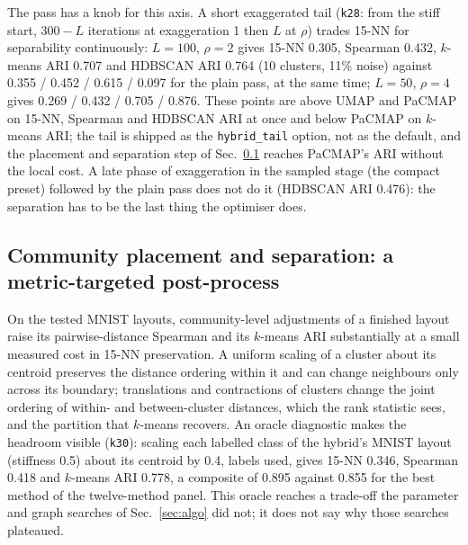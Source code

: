 \documentclass[11pt]{article}
\begin{document}
The pass has a knob for this axis. A short exaggerated tail (\texttt{k28}: from the stiff start, $300 - L$
iterations at exaggeration 1 then $L$ at $\rho$) trades 15-NN for separability continuously: $L = 100$,
$\rho = 2$ gives 15-NN 0.305, Spearman 0.432, $k$-means ARI 0.707 and HDBSCAN ARI 0.764 (10 clusters, 11\%
noise) against 0.355 / 0.452 / 0.615 / 0.097 for the plain pass, at the same time; $L = 50$, $\rho = 4$
gives 0.269 / 0.432 / 0.705 / 0.876. These points are above UMAP and PaCMAP on 15-NN, Spearman and HDBSCAN
ARI at once and below PaCMAP on $k$-means ARI; the tail is shipped as the \texttt{hybrid\_tail} option,
not as the default, and the placement and separation step of Sec.~\ref{sec:placement} reaches PaCMAP's
ARI without the local cost. A late phase of exaggeration in the sampled stage (the compact preset) followed by the
plain pass does not do it (HDBSCAN ARI 0.476): the separation has to be the last thing the optimiser does.

\begin{table}[t]
\centering\small
\caption{Cluster recovery on the layouts of Fig.~\ref{fig:layouts} and Table~\ref{tab:staged}
(\texttt{separability.py}; 10\,000 points, labels used only to score; single layouts). Composite: each of
15-NN, Spearman and $k$-means ARI divided by the panel's best, geometric mean and minimum. Best in bold,
second underlined, among the neighbour embeddings; PCA-2 and PCA-2 refined by the pass are reference rows, not ranked.}
\label{tab:sep}
\resizebox{\textwidth}{!}{}
\end{table}

\subsection{Community placement and separation: a metric-targeted post-process}\label{sec:placement}
On the tested MNIST layouts, community-level adjustments of a finished layout raise its pairwise-distance
Spearman and its $k$-means ARI substantially at a small measured cost in 15-NN preservation. A
uniform scaling of a cluster about its centroid preserves the distance ordering within it and can change
neighbours only across its boundary; translations and contractions of clusters change the joint
ordering of within- and between-cluster distances, which the rank statistic sees, and the partition that
$k$-means recovers. An oracle diagnostic makes the headroom visible (\texttt{k30}): scaling each labelled
class of the hybrid's MNIST layout (stiffness 0.5) about its centroid by 0.4, labels used, gives 15-NN 0.346, Spearman
0.418 and $k$-means ARI 0.778, a composite of 0.895 against 0.855 for the best method of the twelve-method
panel. This oracle reaches a trade-off the parameter and graph searches of Sec.~\ref{sec:algo} did not; it
does not say why those searches plateaued.
\end{document}
